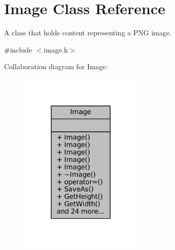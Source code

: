 \hypertarget{classImage}{}\section{Image Class Reference}
\label{classImage}


A class that holds content representing a P\+NG image.  




{\ttfamily \#include $<$image.\+h$>$}



Collaboration diagram for Image\+:\nopagebreak
\begin{figure}[H]
\begin{center}
\leavevmode
\includegraphics[width=167pt]{classImage__coll__graph}
\end{center}
\end{figure}
